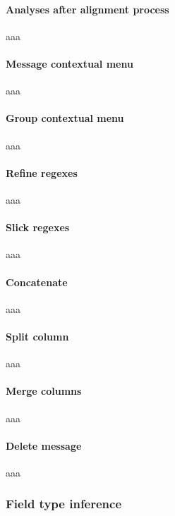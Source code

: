 \documentclass[letterpaper,10pt,english]{sphinxmanual}
\begin{document}
\paragraph{Analyses after alignment process}
\label{modelization/vocabular:analyses-after-alignment-process}
aaa


\paragraph{Message contextual menu}
\label{modelization/vocabular:message-contextual-menu}
aaa


\paragraph{Group contextual menu}
\label{modelization/vocabular:group-contextual-menu}
aaa


\paragraph{Refine regexes}
\label{modelization/vocabular:refine-regexes}
aaa


\paragraph{Slick regexes}
\label{modelization/vocabular:slick-regexes}
aaa


\paragraph{Concatenate}
\label{modelization/vocabular:concatenate}
aaa


\paragraph{Split column}
\label{modelization/vocabular:split-column}
aaa


\paragraph{Merge columns}
\label{modelization/vocabular:merge-columns}
aaa


\paragraph{Delete message}
\label{modelization/vocabular:delete-message}
aaa


\subsubsection{Field type inference}
\label{modelization/vocabular:field-type-inference}
\end{document}
